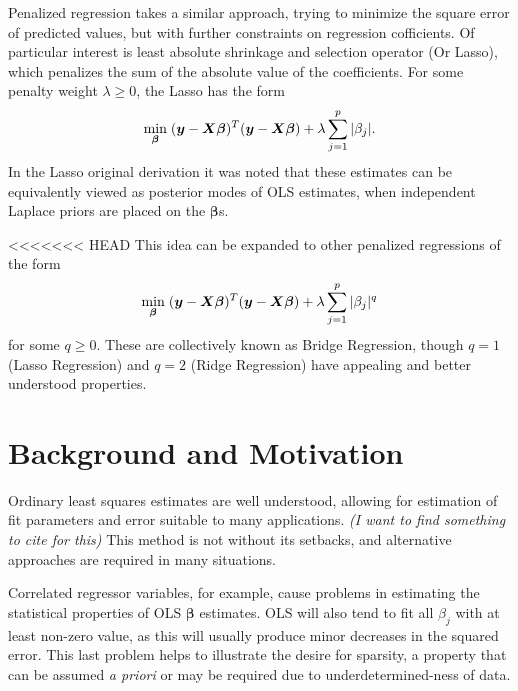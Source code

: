 \documentclass{uwstat572}
\begin{document}
Penalized regression takes a similar approach, trying to minimize the square error of predicted values, but with further constraints on regression cofficients. Of particular interest is least absolute shrinkage and selection operator (Or Lasso), which penalizes the sum of the absolute value of the coefficients. For some penalty weight $\lambda \geq 0$, the Lasso has the form \[
\min_{\boldsymbol{\beta}}  \hspace{.1cm} (\boldsymbol{y}-\boldsymbol{X}\boldsymbol{\beta})^T(\boldsymbol{y}-\boldsymbol{X}\boldsymbol{\beta})+\lambda\sum_{j=1}^p|\beta_j|.
\] In the Lasso original derivation it was noted that these estimates can be equivalently viewed as posterior modes of OLS estimates, when independent Laplace priors are placed on the $\boldsymbol{\beta}$s.\cite{tibshirani1996regression}

<<<<<<< HEAD
This idea can be expanded to other penalized regressions of the form  \[
\min_{\boldsymbol{\beta}}  \hspace{.1cm} (\boldsymbol{y}-\boldsymbol{X}\boldsymbol{\beta})^T(\boldsymbol{y}-\boldsymbol{X}\boldsymbol{\beta})+\lambda\sum_{j=1}^p|\beta_j|^q
\] for some $q\geq0$.\cite{park2008bayesian} These are collectively known as Bridge Regression, though $q=1$ (Lasso Regression) and $q=2$ (Ridge Regression) have appealing and better understood properties.

\section{Background and Motivation}\label{Motivation}
Ordinary least squares estimates are well understood, allowing for estimation of fit parameters and error suitable to many applications.\emph{\color{red} (I want to find something to cite for this) \color{black}} This method is not without its setbacks, and alternative approaches are required in many situations. 

Correlated regressor variables, for example, cause problems in estimating the statistical properties of OLS $\boldsymbol{\beta}$ estimates. OLS will also tend to fit all $\beta_j$ with at least non-zero value, as this will usually produce minor decreases in the squared error.\cite{seeger2008bayesian} This last problem helps to illustrate the desire for sparsity, a property that can be assumed \emph{a priori} or may be required due to underdetermined-ness of data.
\end{document}

